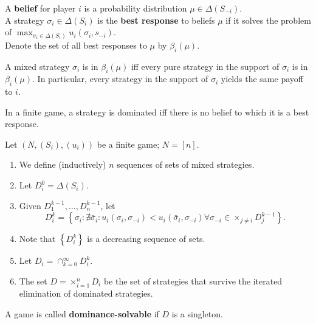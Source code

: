 \documentclass[11pt]{elegantbook}
\begin{document}
\begin{definition}
    \normalfont
    A \textbf{belief} for player $i$ is a probability distribution $\mu\in\Delta(S_{-i})$.\\
    A strategy $\sigma_i \in \Delta(S_i)$ is the \textbf{best response} to beliefs $\mu$ if it solves the problem of $\max_{\sigma_i\in\Delta(S_i)}u_i(\sigma_i,s_{-i})$.\\
    Denote the set of all best responses to $\mu$ by $\beta_i(\mu)$.
\end{definition}
\begin{lemma}
    A mixed strategy $\sigma_i$ is in $\beta_i(\mu)$ iff every pure strategy in the support of $\sigma_i$ is in $\beta_i(\mu)$. In particular, every strategy in the support of $\sigma_i$ yields the same payoff to $i$.
\end{lemma}

\begin{theorem}
    In a finite game, a strategy is dominated iff there is no belief to which it is a best response.
\end{theorem}


\begin{definition}
    \normalfont
    Let $\left(N,\left(S_i\right),\left(u_i\right)\right)$ be a finite game; $N=[n]$.
    \begin{enumerate}[$\bullet$]
        \item We define (inductively) $n$ sequences of sets of mixed strategies.
        \item Let $D_i^0=\Delta\left(S_i\right)$.
        \item Given $D_1^{k-1}, \ldots, D_n^{k-1}$, let
        $$
        D_i^k=\left\{\sigma_i: \nexists \bar{\sigma}_i: u_i\left(\sigma_i, \sigma_{-i}\right)<u_i\left(\bar{\sigma}_i, \sigma_{-i}\right) \forall \sigma_{-i} \in \times_{j \neq i} D_j^{k-1}\right\} .
        $$
        \item Note that $\left\{D_i^k\right\}$ is a decreasing sequence of sets.
        \item Let $D_i = \cap_{k=0}^\infty D_i^k$.
        \item The set $D = \times_{i=1}^n D_i$ be the set of strategies that survive the iterated elimination of dominated strategies.
    \end{enumerate}
    A game is called \textbf{dominance-solvable} if $D$ is a singleton.
\end{definition}
\end{document}
